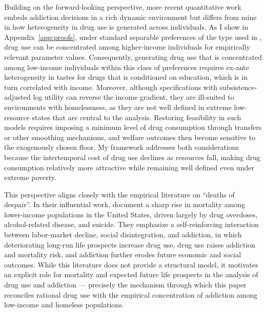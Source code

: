 \documentclass[parskip=full]{article}
\theoremstyle{plain}
\theoremstyle{definition}
\theoremstyle{remark}
\begin{document}
Building on the forward-looking perspective, more recent quantitative work embeds addiction decisions in a rich dynamic environment but differs from mine in how heterogeneity in drug use is generated across individuals. As I show in Appendix~\ref{app:proofs}, under standard separable preferences of the type used in \citet{greenwood_guner_kopecky_2025_downward_spiral}, drug use can be concentrated among higher-income individuals for empirically relevant parameter values. Consequently, generating drug use that is concentrated among low-income individuals within this class of preferences requires ex-ante heterogeneity in tastes for drugs that is conditioned on education, which is in turn correlated with income. Moreover, although specifications with subsistence-adjusted log utility can reverse the income gradient, they are ill-suited to environments with homelessness, as they are not well defined in extreme low-resource states that are central to the analysis. Restoring feasibility in such models requires imposing a minimum level of drug consumption through transfers or other smoothing mechanisms, and welfare outcomes then become sensitive to the exogenously chosen floor. My framework addresses both considerations because the intertemporal cost of drug use declines as resources fall, making drug consumption relatively more attractive while remaining well defined even under extreme poverty.

This perspective aligns closely with the empirical literature on ``deaths of despair''. In their influential work, \citet{case_deaton_2020} document a sharp rise in mortality among lower-income populations in the United States, driven largely by drug overdoses, alcohol-related disease, and suicide. They emphasize a self-reinforcing interaction between labor-market decline, social disintegration, and addiction, in which deteriorating long-run life prospects increase drug use, drug use raises addiction and mortality risk, and addiction further erodes future economic and social outcomes. While this literature does not provide a structural model, it motivates an explicit role for mortality and expected future life prospects in the analysis of drug use and addiction — precisely the mechanism through which this paper reconciles rational drug use with the empirical concentration of addiction among low-income and homeless populations.
\end{document}
